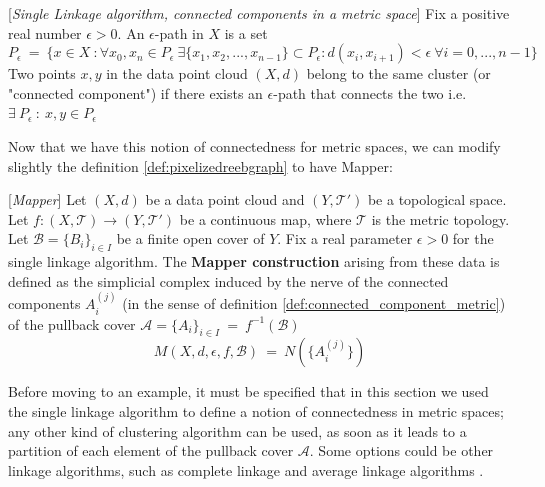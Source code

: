 \begin{definition}{[\textit{Single Linkage algorithm, connected components in a metric space}]}
	Fix a positive real number $\epsilon>0$. An $\epsilon$-path in $X$ is a set $$P_\epsilon\ =\ \{x \in X\ :\forall x_0,x_n\in P_\epsilon\  \exists \{ x_1, x_2, ..., x_{n-1}\} \subset P_\epsilon: d(x_i,x_{i+1})<\epsilon\  \forall i = 0, ..., n-1\}$$ Two points $x,y$ in the data point cloud $(X,d)$ belong to the same cluster (or "connected component") if there exists an $\epsilon$-path that connects the two i.e. $\exists \ P_\epsilon\ :\ x,y\in P_\epsilon$
	\label{def:connected_component_metric}
\end{definition}
Now that we have this notion of connectedness for metric spaces, we can modify slightly the definition \ref{def:pixelizedreebgraph} to have Mapper:
\begin{definition}{[\textit{Mapper}]}
	Let $(X,d)$ be a data point cloud and $(Y,\mathcal{T}')$ be a topological space. Let $f : (X,\mathcal{T}) \rightarrow (Y,\mathcal{T}')$ be a continuous map, where $\mathcal{T}$ is the metric topology. Let $\mathcal{B}=\{B_i\}_{i\in I}$ be a finite open cover of $Y$. Fix a real parameter $\epsilon>0$ for the single linkage algorithm. The \textbf{Mapper construction} arising from these data is defined as the simplicial complex induced by the nerve of the connected components $A_i^{(j)}$ (in the sense of definition \ref{def:connected_component_metric}) of the pullback cover $\mathcal{A}=\{A_i\}_{i\in I}\ =\ f^{-1}(\mathcal{B})$ $$M(X,d,\epsilon,f,\mathcal{B})\ =\ N(\{A_i^{(j)}\})$$
\end{definition}

Before moving to an example, it must be specified that in this section we used the single linkage algorithm to define a notion of connectedness in metric spaces; any other kind of clustering algorithm can be used, as soon as it leads to a partition of each element of the pullback cover $\mathcal{A}$. Some options could be other linkage algorithms, such as complete linkage and average linkage algorithms \cite{InformationRetrieval}. 

